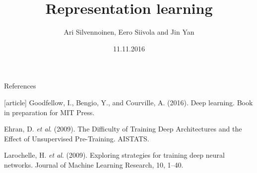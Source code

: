 \documentclass[first=purple,second=blue,logo=blueque]{./misc/aaltoslides}
\title{Representation learning}
\institute[~]{Aalto deep learning course}
\author[~]{Ari Silvennoinen, Eero Siivola and Jin Yan}
\date{11.11.2016}
\begin{document}
\aaltotitleframe




\begin{frame}{References}
\begin{thebibliography}{9}
[article]
Goodfellow, I., Bengio, Y., and Courville, A. (2016). Deep learning. Book in preparation for MIT Press.

 Ehran, D. \textit{et al}. (2009). The Difficulty of Training Deep Architectures and the Effect of Unsupervised Pre-Training. AISTATS.

 Larochelle, H. \textit{et al}. (2009). Exploring strategies for training deep neural networks. Journal of Machine Learning Research, 10, 1--40.
\end{thebibliography}
\end{frame}
\end{document}
